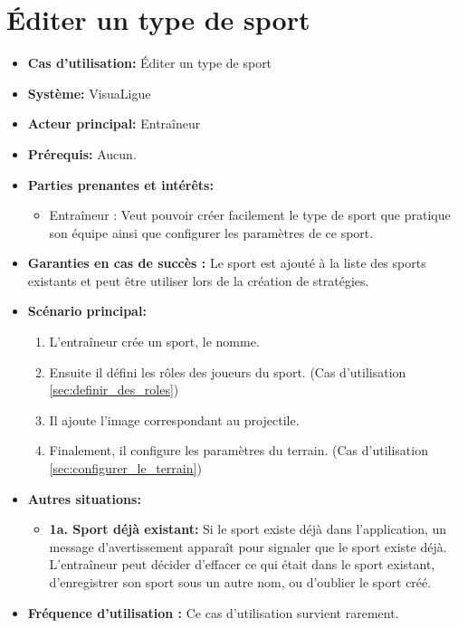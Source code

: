 \section{Éditer un type de sport}
\label{sec:ajouter_un_type_de_sport}

\begin{itemize}
    \item \textbf{Cas d'utilisation:} Éditer un type de sport
    \item \textbf{Syst\`eme:} VisuaLigue
    \item \textbf{Acteur principal:} Entra\^ineur
    \item \textbf{Pr\'erequis:} Aucun.
    \item \textbf{Parties prenantes et int\'er\^ets:}
    	\begin{itemize}
    		\item Entraîneur : Veut pouvoir cr\'eer facilement le type de sport que pratique son équipe ainsi que configurer les paramètres de ce sport. 
    	\end{itemize}
    \item \textbf{Garanties en cas de succ\`es :} Le sport est ajout\'e \`a la liste des sports existants et peut \^etre utiliser lors de la cr\'eation de strat\'egies.
    \item \textbf{Sc\'enario principal:}
        \begin{enumerate}
            \item L'entra\^ineur cr\'ee un sport, le nomme.
            \item Ensuite il défini les r\^oles des joueurs du sport. (Cas d'utilisation \ref{sec:definir_des_roles})
            \item Il ajoute l'image correspondant au projectile.
            \item Finalement, il configure les paramètres du terrain. (Cas d'utilisation \ref{sec:configurer_le_terrain})
        \end{enumerate}
    \item \textbf{Autres situations:}
    \begin{itemize}
        \item \textbf{1a. Sport d\'ej\`a existant:} Si le sport existe d\'ej\`a dans l'application, un message d'avertissement appara\^it pour signaler que le sport existe d\'ej\`a.
        L'entraîneur peut d\'ecider d'effacer ce qui \'etait dans le sport existant, d'enregistrer son sport sous un autre nom, ou d'oublier le sport cr\'e\'e.
    \end{itemize}
    \item \textbf{Fréquence d'utilisation :} Ce cas d'utilisation survient rarement.
\end{itemize}




